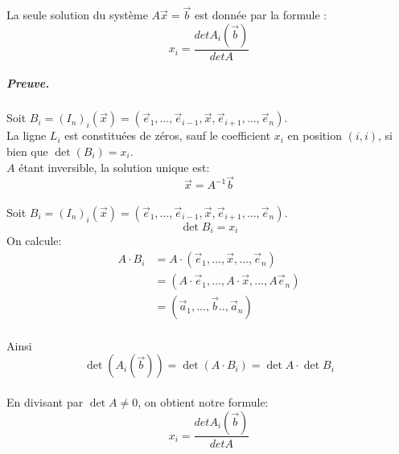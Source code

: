     La seule solution du système $A\vec{x} = \vec{b}$ est donnée par la formule : 
    \[
    x_i = \frac{detA_i(\vec{b})}{det A}
    \]
\subparagraph{Preuve.}
Soit $B_i = (I_n)_i(\vec{x}) = (\vec{e}_1,\dots, \vec{e}_{i-1}, \vec{x}, \vec{e}_{i+1}, \dots, \vec{e}_n  )$.
\\
La ligne $L_i$ est constituées de zéros, sauf le coefficient $x_i$ en position $(i, i)$, si bien que $\det (B_i) = x_i$.
\\
$A$ étant inversible, la solution unique est:
\[\vec{x} = A^{-1}\vec{b}\]
\\
Soit $B_i = (I_n)_i(\vec{x}) = (\vec{e}_1,\dots, \vec{e}_{i-1}, \vec{x}, \vec{e}_{i+1}, \dots, \vec{e}_n)$.
\\
\[\det B_i = x_i\]
On calcule:
\\
\begin{align*}
A\cdot B_i &= A\cdot(\vec{e}_1, ..., \vec{x}, ..., \vec{e}_n)\\
&= (A\cdot\vec{e}_1, ..., A\cdot\vec{x}, ..., A\vec{e}_n)\\
&= (\vec{a}_1, ..., \vec{b} .., \vec{a}_n)    
\end{align*}
\\
Ainsi \[\det(A_i(\vec{b})) = \det(A\cdot B_i) = \det A \cdot \det B_i\]
\\
En divisant par $\det A \neq 0$, on obtient notre formule:
    \[
    x_i = \frac{detA_i(\vec{b})}{det A}
    \]